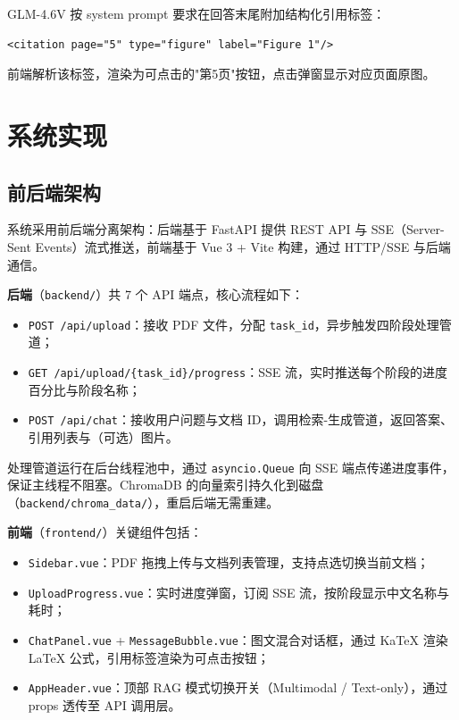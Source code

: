 ﻿\documentclass[UTF8, heading=true]{ctexart}
\begin{document}
GLM-4.6V 按 system prompt 要求在回答末尾附加结构化引用标签：
\begin{lstlisting}[style=pythonstyle]
<citation page="5" type="figure" label="Figure 1"/>
\end{lstlisting}
前端解析该标签，渲染为可点击的"第5页"按钮，点击弹窗显示对应页面原图。

\section{系统实现}

\subsection{前后端架构}

系统采用前后端分离架构：后端基于 FastAPI 提供 REST API 与 SSE（Server-Sent Events）流式推送，前端基于 Vue 3 + Vite 构建，通过 HTTP/SSE 与后端通信。

\textbf{后端}（\texttt{backend/}）共 7 个 API 端点，核心流程如下：
\begin{itemize}
    \item \texttt{POST /api/upload}：接收 PDF 文件，分配 \texttt{task\_id}，异步触发四阶段处理管道；
    \item \texttt{GET /api/upload/\{task\_id\}/progress}：SSE 流，实时推送每个阶段的进度百分比与阶段名称；
    \item \texttt{POST /api/chat}：接收用户问题与文档 ID，调用检索-生成管道，返回答案、引用列表与（可选）图片。
\end{itemize}

处理管道运行在后台线程池中，通过 \texttt{asyncio.Queue} 向 SSE 端点传递进度事件，保证主线程不阻塞。ChromaDB 的向量索引持久化到磁盘（\texttt{backend/chroma\_data/}），重启后端无需重建。

\textbf{前端}（\texttt{frontend/}）关键组件包括：
\begin{itemize}
    \item \texttt{Sidebar.vue}：PDF 拖拽上传与文档列表管理，支持点选切换当前文档；
    \item \texttt{UploadProgress.vue}：实时进度弹窗，订阅 SSE 流，按阶段显示中文名称与耗时；
    \item \texttt{ChatPanel.vue} + \texttt{MessageBubble.vue}：图文混合对话框，通过 KaTeX 渲染 LaTeX 公式，引用标签渲染为可点击按钮；
    \item \texttt{AppHeader.vue}：顶部 RAG 模式切换开关（Multimodal / Text-only），通过 props 透传至 API 调用层。
\end{itemize}
\end{document}
